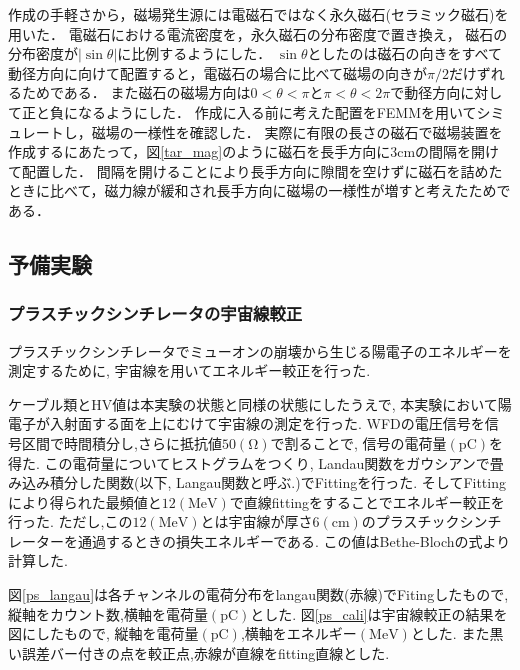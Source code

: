 作成の手軽さから，磁場発生源には電磁石ではなく永久磁石(セラミック磁石)を用いた．
電磁石における電流密度を，永久磁石の分布密度で置き換え，
磁石の分布密度が$|\sin\theta|$に比例するようにした．
$\sin\theta$としたのは磁石の向きをすべて動径方向に向けて配置すると，電磁石の場合に比べて磁場の向きが$\pi/2$だけずれるためである．
また磁石の磁場方向は$0<\theta<\pi$と$\pi<\theta<2\pi$で動径方向に対して正と負になるようにした．
作成に入る前に考えた配置をFEMMを用いてシミュレートし，磁場の一様性を確認した．
実際に有限の長さの磁石で磁場装置を作成するにあたって，図\ref{tar_mag}のように磁石を長手方向に$3\mathrm{cm}$の間隔を開けて配置した．
間隔を開けることにより長手方向に隙間を空けずに磁石を詰めたときに比べて，磁力線が緩和され長手方向に磁場の一様性が増すと考えたためである．

\newpage
\subsection{予備実験}
\subsubsection{プラスチックシンチレータの宇宙線較正}
プラスチックシンチレータでミューオンの崩壊から生じる陽電子のエネルギーを測定するために, 宇宙線を用いてエネルギー較正を行った.

ケーブル類とHV値は本実験の状態と同様の状態にしたうえで,
本実験において陽電子が入射面する面を上にむけて宇宙線の測定を行った.
WFDの電圧信号を信号区間で時間積分し,さらに抵抗値$50(\mathrm{\Omega})$で割ることで,
信号の電荷量$(\mathrm{pC})$を得た.
この電荷量についてヒストグラムをつくり, Landau関数をガウシアンで畳み込み積分した関数(以下, Langau関数と呼ぶ.)でFittingを行った.
そしてFittingにより得られた最頻値と$12(\mathrm{MeV})$で直線fittingをすることでエネルギー較正を行った.
ただし,この$12(\mathrm{MeV})$とは宇宙線が厚さ$6(\mathrm{cm})$のプラスチックシンチレーターを通過するときの損失エネルギーである.
この値はBethe-Blochの式より計算した.\cite{leo}

図\ref{ps_langau}は各チャンネルの電荷分布をlangau関数(赤線)でFitingしたもので,
縦軸をカウント数,横軸を電荷量$(\mathrm{pC})$とした.
図\ref{ps_cali}は宇宙線較正の結果を図にしたもので,
縦軸を電荷量$(\mathrm{pC})$,横軸をエネルギー$(\mathrm{MeV})$とした.
また黒い誤差バー付きの点を較正点,赤線が直線をfitting直線とした.

